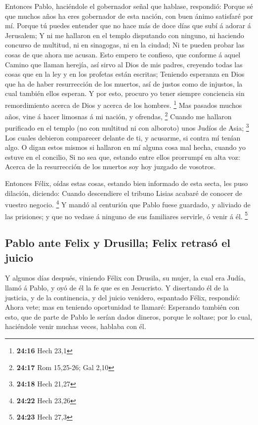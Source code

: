  Entonces Pablo, haciéndole el gobernador señal que
hablase, respondió: Porque sé que muchos años ha eres gobernador de esta
nación, con buen ánimo satisfaré por mí.  Porque tú puedes
entender que no hace más de doce días que subí á adorar á Jerusalem;
 Y ni me hallaron en el templo disputando con ninguno, ni
haciendo concurso de multitud, ni en sinagogas, ni en la ciudad;
 Ni te pueden probar las cosas de que ahora me acusan.
 Esto empero te confieso, que conforme á aquel Camino que
llaman herejía, así sirvo al Dios de mis padres, creyendo todas las
cosas que en la ley y en los profetas están escritas; 
Teniendo esperanza en Dios que ha de haber resurrección de los muertos,
así de justos como de injustos, la cual también ellos esperan.
 Y por esto, procuro yo tener siempre conciencia sin
remordimiento acerca de Dios y acerca de los hombres. \footnote{\textbf{24:16}
  Hech 23,1}  Mas pasados muchos años, vine á hacer
limosnas á mi nación, y ofrendas, \footnote{\textbf{24:17} Rom 15,25-26;
  Gal 2,10}  Cuando me hallaron purificado en el templo (no
con multitud ni con alboroto) unos Judíos de Asia; \footnote{\textbf{24:18}
  Hech 21,27}  Los cuales debieron comparecer delante de
ti, y acusarme, si contra mí tenían algo.  O digan estos
mismos si hallaron en mí alguna cosa mal hecha, cuando yo estuve en el
concilio,  Si no sea que, estando entre ellos prorrumpí en
alta voz: Acerca de la resurrección de los muertos soy hoy juzgado de
vosotros.

 Entonces Félix, oídas estas cosas, estando bien informado
de esta secta, les puso dilación, diciendo: Cuando descendiere el
tribuno Lisias acabaré de conocer de vuestro negocio. \footnote{\textbf{24:22}
  Hech 23,26}  Y mandó al centurión que Pablo fuese
guardado, y aliviado de las prisiones; y que no vedase á ninguno de sus
familiares servirle, ó venir á él. \footnote{\textbf{24:23} Hech 27,3}

\hypertarget{pablo-ante-felix-y-drusilla-felix-retrasuxf3-el-juicio}{%
\subsection{Pablo ante Felix y Drusilla; Felix retrasó el
juicio}\label{pablo-ante-felix-y-drusilla-felix-retrasuxf3-el-juicio}}

 Y algunos días después, viniendo Félix con Drusila, su
mujer, la cual era Judía, llamó á Pablo, y oyó de él la fe que es en
Jesucristo.  Y disertando él de la justicia, y de la
continencia, y del juicio venidero, espantado Félix, respondió: Ahora
vete; mas en teniendo oportunidad te llamaré:  Esperando
también con esto, que de parte de Pablo le serían dados dineros, porque
le soltase; por lo cual, haciéndole venir muchas veces, hablaba con él.

